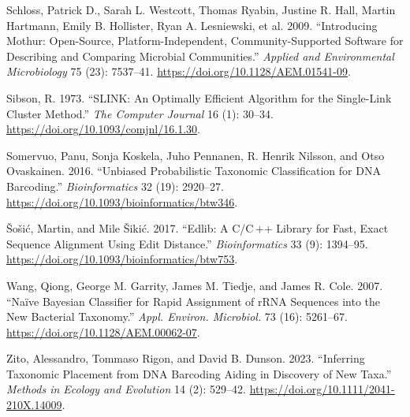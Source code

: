 \documentclass[
]{article}
\newlength{\cslhangindent}
\newenvironment{CSLReferences}[2] %
 {\begin{list}{}{%
  \setlength{\itemindent}{0pt}
  \setlength{\leftmargin}{0pt}
  \setlength{\parsep}{0pt}
  \ifodd #1
   \setlength{\leftmargin}{\cslhangindent}
   \setlength{\itemindent}{-1\cslhangindent}
  \fi
  \setlength{\itemsep}{#2\baselineskip}}}
 {\end{list}}
\begin{document}
\begin{CSLReferences}{1}{0}
Schloss, Patrick D., Sarah L. Westcott, Thomas Ryabin, Justine R. Hall, Martin Hartmann, Emily B. Hollister, Ryan A. Lesniewski, et al. 2009. {``Introducing Mothur: {Open-Source}, {Platform-Independent}, {Community-Supported Software} for {Describing} and {Comparing Microbial Communities}.''} \emph{Applied and Environmental Microbiology} 75 (23): 7537--41. \url{https://doi.org/10.1128/AEM.01541-09}.

Sibson, R. 1973. {``{SLINK}: {An} Optimally Efficient Algorithm for the Single-Link Cluster Method.''} \emph{The Computer Journal} 16 (1): 30--34. \url{https://doi.org/10.1093/comjnl/16.1.30}.

Somervuo, Panu, Sonja Koskela, Juho Pennanen, R. Henrik Nilsson, and Otso Ovaskainen. 2016. {``Unbiased Probabilistic Taxonomic Classification for {DNA} Barcoding.''} \emph{Bioinformatics} 32 (19): 2920--27. \url{https://doi.org/10.1093/bioinformatics/btw346}.

Šošić, Martin, and Mile Šikić. 2017. {``Edlib: A {C}/{C} ++ Library for Fast, Exact Sequence Alignment Using Edit Distance.''} \emph{Bioinformatics} 33 (9): 1394--95. \url{https://doi.org/10.1093/bioinformatics/btw753}.

Wang, Qiong, George M. Garrity, James M. Tiedje, and James R. Cole. 2007. {``Naïve {Bayesian Classifier} for {Rapid Assignment} of {rRNA Sequences} into the {New Bacterial Taxonomy}.''} \emph{Appl. Environ. Microbiol.} 73 (16): 5261--67. \url{https://doi.org/10.1128/AEM.00062-07}.

Zito, Alessandro, Tommaso Rigon, and David B. Dunson. 2023. {``Inferring Taxonomic Placement from {DNA} Barcoding Aiding in Discovery of New Taxa.''} \emph{Methods in Ecology and Evolution} 14 (2): 529--42. \url{https://doi.org/10.1111/2041-210X.14009}.

\end{CSLReferences}
\end{document}
